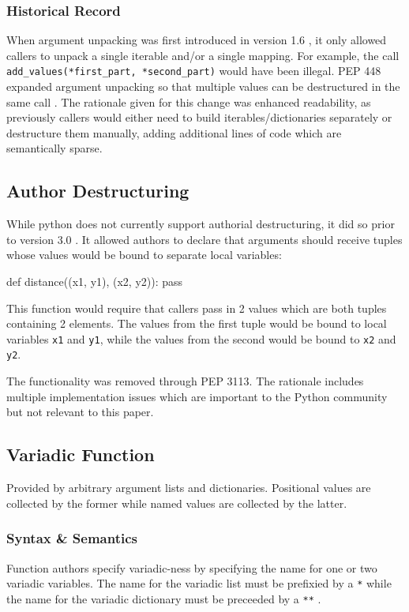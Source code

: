\subsubsection{Historical Record}
When argument unpacking was first introduced in version 1.6
\parencite[][Misc/HISTORY lines 26740-26743]{python-source},
it only allowed callers to unpack a single iterable and/or a single mapping.
For example, the call \texttt{add\_values(*first\_part, *second\_part)} would have been
illegal.
PEP 448 expanded argument unpacking so that multiple values can be destructured in the
same call \parencite[][peps/pep-0448.rst]{python-peps}.
The rationale given for this change was enhanced readability, as previously callers would
either need to build iterables/dictionaries separately or destructure them manually,
adding additional lines of code which are semantically sparse.

\subsection{Author Destructuring}
While python does not currently support authorial destructuring, it did so prior to
version 3.0 \parencite[][peps/pep-3113.rst]{python-peps}.
It allowed authors to declare that arguments should receive tuples whose values would be
bound to separate local variables:

\begin{pygmented}[lang=python]
def distance((x1, y1), (x2, y2)):
  pass
\end{pygmented}

This function would require that callers pass in 2 values which are both tuples containing
2 elements.
The values from the first tuple would be bound to local variables \texttt{x1} and
\texttt{y1}, while the values from the second would be bound to \texttt{x2} and
\texttt{y2}.

The functionality was removed through PEP 3113.
The rationale includes multiple implementation issues which are important to the Python
community but not relevant to this paper.

\subsection{Variadic Function}
Provided by arbitrary argument lists and dictionaries.
Positional values are collected by the former while named values are collected by the
latter.

\subsubsection{Syntax \& Semantics}
Function authors specify variadic-ness by specifying the name for one or two variadic
variables.
The name for the variadic list must be prefixied by a \texttt{*} while the name for the
variadic dictionary must be preceeded by a \texttt{**}
\parencite[][reference/compound\_stmts.html section 8.7 "Function Definitions"]{python-doc-html}.

